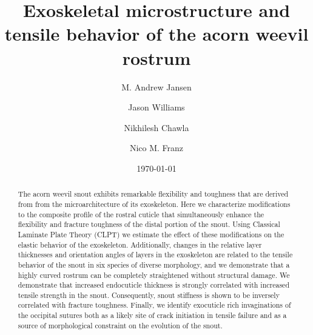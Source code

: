 \documentclass[twocolumn, linenumbers, superscriptaddress, nofootinbib]{revtex4-1}
\begin{document}
	\begin{abstract}
		The acorn weevil snout exhibits remarkable flexibility and toughness that are derived from from the microarchitecture of its exoskeleton.
		Here we characterize modifications to the composite profile of the rostral cuticle that simultaneously enhance the flexibility and fracture toughness of the distal portion of the snout.
		Using Classical Laminate Plate Theory (CLPT) we estimate the effect of these modifications on the elastic behavior of the exoskeleton.
		Additionally, changes in the relative layer thicknesses and orientation angles of layers in the exoskeleton are related to the tensile behavior of the snout in six species of diverse morphology, and we demonstrate that a highly curved rostrum can be completely straightened without structural damage.
		We demonstrate that increased endocuticle thickness is strongly correlated with increased tensile strength in the snout.
		Consequently, snout stiffness is shown to be inversely correlated with fracture toughness.
		Finally, we identify exocuticle rich invaginations of the occipital sutures both as a likely site of crack initiation in tensile failure and as a source of morphological constraint on the evolution of the snout.
		
	\end{abstract}
	
	{\title{Exoskeletal microstructure and tensile behavior of the acorn weevil rostrum}
	\date{\today}
	
	\author{M. Andrew Jansen}
	\author{Jason Williams}
	\author{Nikhilesh Chawla}
	\author{Nico M. Franz}
		
	\maketitle
	}
\end{document}
